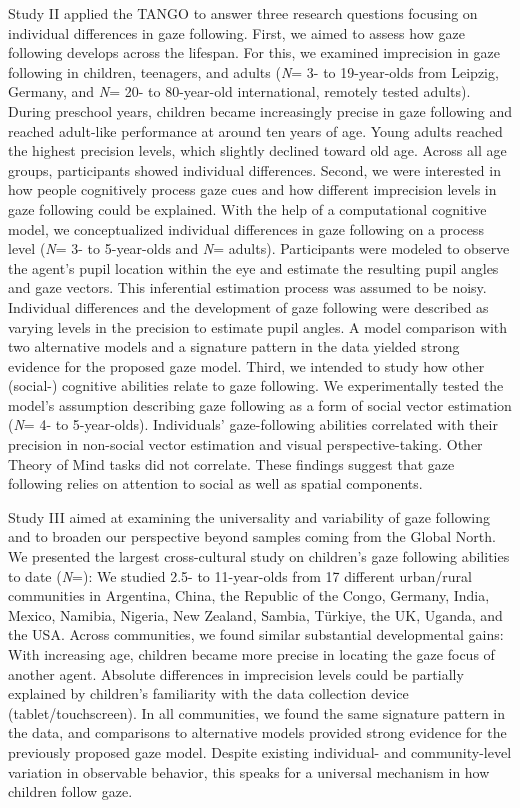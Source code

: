 \documentclass[
]{scrbook}
\begin{document}
Study II applied the TANGO to answer three research questions focusing on individual differences in gaze following.
First, we aimed to assess how gaze following develops across the lifespan. For this, we examined imprecision in gaze following in children, teenagers, and adults (\emph{N}\thinspace = 3- to 19-year-olds from Leipzig, Germany, and \emph{N}\thinspace = 20- to 80-year-old international, remotely tested adults). During preschool years, children became increasingly precise in gaze following and reached adult-like performance at around ten years of age. Young adults reached the highest precision levels, which slightly declined toward old age. Across all age groups, participants showed individual differences.
Second, we were interested in how people cognitively process gaze cues and how different imprecision levels in gaze following could be explained. With the help of a computational cognitive model, we conceptualized individual differences in gaze following on a process level (\emph{N}\thinspace = 3- to 5-year-olds and \emph{N}\thinspace = adults). Participants were modeled to observe the agent's pupil location within the eye and estimate the resulting pupil angles and gaze vectors. This inferential estimation process was assumed to be noisy. Individual differences and the development of gaze following were described as varying levels in the precision to estimate pupil angles. A model comparison with two alternative models and a signature pattern in the data yielded strong evidence for the proposed gaze model.
Third, we intended to study how other (social-) cognitive abilities relate to gaze following. We experimentally tested the model's assumption describing gaze following as a form of social vector estimation (\emph{N}\thinspace = 4- to 5-year-olds). Individuals' gaze-following abilities correlated with their precision in non-social vector estimation and visual perspective-taking. Other Theory of Mind tasks did not correlate. These findings suggest that gaze following relies on attention to social as well as spatial components.

Study III aimed at examining the universality and variability of gaze following and to broaden our perspective beyond samples coming from the Global North. We presented the largest cross-cultural study on children's gaze following abilities to date (\emph{N}\thinspace =): We studied 2.5- to 11-year-olds from 17 different urban/rural communities in Argentina, China, the Republic of the Congo, Germany, India, Mexico, Namibia, Nigeria, New Zealand, Sambia, Türkiye, the UK, Uganda, and the USA. Across communities, we found similar substantial developmental gains: With increasing age, children became more precise in locating the gaze focus of another agent. Absolute differences in imprecision levels could be partially explained by children's familiarity with the data collection device (tablet/touchscreen). In all communities, we found the same signature pattern in the data, and comparisons to alternative models provided strong evidence for the previously proposed gaze model. Despite existing individual- and community-level variation in observable behavior, this speaks for a universal mechanism in how children follow gaze.
\end{document}
